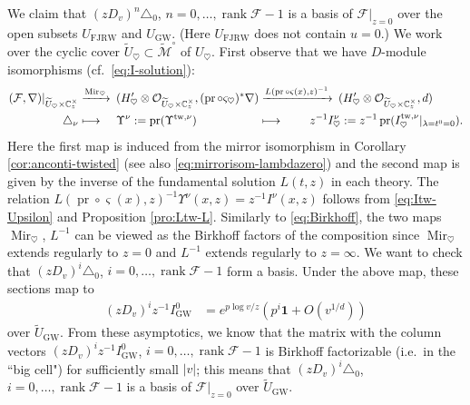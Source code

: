\documentclass[11pt]{amsart}
\theoremstyle{definition} %
\theoremstyle{remark} %
\newcommand{\CC}{\mathbb C}
\newcommand{\tw}{{\rm tw}}
\def\GW{\operatorname{\text{GW}}}
\newcommand{\cO}{\mathcal{O}}
\newcommand{\cM}{\mathcal{M}}
\newcommand{\tcMo}{\widetilde{\cM}^\circ}
\newcommand{\cF}{\mathcal{F}}
\newcommand{\unit}{\boldsymbol{1}}
\newcommand{\FJRW}{{\operatorname{FJRW}}}
\renewcommand{\GW}{{\operatorname{GW}}}
\newcommand{\pr}{\operatorname{pr}}
\newcommand{\Mir}{\operatorname{Mir}}
\newcommand{\rank}{\operatorname{rank}}
\newcommand{\tU}{\widetilde{U}}
\begin{document}
We claim that $(z D_v)^n \triangle_0$, 
$n=0,\dots, \rank \cF -1$  
is a basis of $\cF|_{z=0}$ over the open subsets 
$U_{\FJRW}$ and $U_{\GW}$. 
(Here $U_{\FJRW}$ does not contain $u=0$.)
We work over the cyclic cover $\tU_{\heartsuit}\subset \tcMo$ 
of $U_{\heartsuit}$.  
First observe that we have $D$-module 
isomorphisms  
(cf.\ \eqref{eq:I-solution}): 
\begin{align*} 
(\cF,\nabla)|_{\tU_\heartsuit\times \CC^\times_z} 
& \xrightarrow{\Mir_\heartsuit} & 
& \hspace{-5pt} 
(H'_\heartsuit \otimes \cO_{\tU_\heartsuit \times \CC_z^\times}, 
(\pr \circ \varsigma_\heartsuit)^* \nabla) & 
& \hspace{-10pt} 
\xrightarrow{L(\pr\circ \varsigma(x),z)^{-1}} &  
& \hspace{-5pt} 
(H'_{\heartsuit} \otimes \cO_{\tU_\heartsuit \times \CC_z^\times},d) \\ 
\triangle_\nu 
& \longmapsto &  
& \hspace{-5pt} 
\Upsilon^\nu := \pr( \Upsilon^{\tw,\nu}) & 
& \hspace{-10pt} \longmapsto & 
& \hspace{-30pt} 
z^{-1} I^\nu_{\heartsuit} := 
z^{-1} \pr( 
I^{\tw,\nu}_{\heartsuit}|_{\lambda=t^0=0}).  
\end{align*} 
Here the first map is induced from the mirror 
isomorphism in Corollary \ref{cor:anconti-twisted} 
(see also \eqref{eq:mirrorisom-lambdazero}) 
and the second map is given by the inverse of 
the fundamental solution $L(t,z)$ in each theory. 
The relation 
$L(\pr\circ \varsigma(x),z)^{-1} \Upsilon^\nu(x,z) 
= z^{-1} I^\nu(x,z)$ follows from 
\eqref{eq:Itw-Upsilon} and Proposition \ref{pro:Ltw-L}. 
Similarly to \eqref{eq:Birkhoff}, 
the two maps $\Mir_\heartsuit$, $L^{-1}$ can be viewed as 
the Birkhoff factors of the composition 
since $\Mir_\heartsuit$ extends regularly to $z=0$ 
and $L^{-1}$ extends regularly to $z=\infty$. 
We want to check that $(z D_v)^i \triangle_0$, 
$i=0,\dots,\rank \cF-1$ form a basis. 
Under the above map, these sections map to 
\begin{align*} 
(zD_v)^i z^{-1} I^0_{\GW} &= e^{p\log v/z} 
\left( p^i \unit + O(v^{1/d}) \right)
\end{align*} 
over $\tU_{\GW}$. From these asymptotics, 
we know that the matrix with the column vectors 
$(zD_v)^i z^{-1} I^0_{\GW}$, $i=0,\dots,\rank \cF-1$ 
is Birkhoff factorizable (i.e.\ in the ``big cell") 
for sufficiently small $|v|$; this means that $(zD_v)^i \triangle_0$, 
$i=0,\dots,\rank \cF-1$ is a basis of $\cF|_{z=0}$ 
over $\tU_{\GW}$. 
\end{document}
